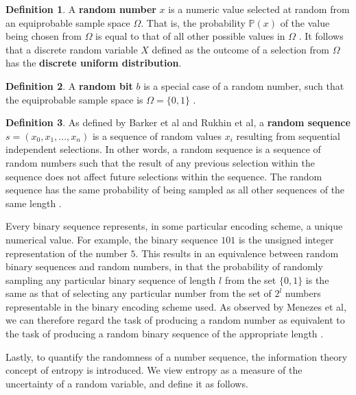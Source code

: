\documentclass[12pt, titlepage]{report}
\theoremstyle{definition}
\newtheorem{definition}{Definition}
\begin{document}
\begin{definition}
A \textbf{random number} $x$ is a numeric value selected at random from an equiprobable sample space $\Omega$. That is, the probability $\mathbb{P}(x)$ of the value being chosen from $\Omega$ is equal to that of all other possible values in $\Omega$ \cite[p. 7]{barker2007recommendation} \cite[s. 1.1.1]{rukhin2001statistical}. It follows that a discrete random variable $X$ defined as the outcome of a selection from $\Omega$ has the \textbf{discrete uniform distribution}.
\end{definition}

\begin{definition}
A \textbf{random bit} $b$ is a special case of a random number, such that the equiprobable sample space is $\Omega = \{0, 1\}$ \cite[s. 1.1.1]{rukhin2001statistical}.
\end{definition}

\begin{definition}
As defined by Barker et al and Rukhin et al, a \textbf{random sequence} $s = (x_0, x_1, ..., x_n)$ is a sequence of random values $x_i$ resulting from sequential independent selections. In other words, a random sequence is a sequence of random numbers such that the result of any previous selection within the sequence does not affect future selections within the sequence. The random sequence has the same probability of being sampled as all other sequences of the same length \cite[p. 7]{barker2007recommendation} \cite[s. 1.1.1]{rukhin2001statistical}.
\end{definition}

Every binary sequence represents, in some particular encoding scheme, a unique numerical value. For example, the binary sequence $101$ is the unsigned integer representation of the number $5$. This results in an equivalence between random binary sequences and random numbers, in that the probability of randomly sampling any particular binary sequence of length $l$ from the set $\{0, 1\}$ is the same as that of selecting any particular number from the set of $2^l$ numbers representable in the binary encoding scheme used. As observed by Menezes et al, we can therefore regard the task of producing a random number as equivalent to the task of producing a random binary sequence of the appropriate length \cite[p. 170]{menezes1996handbook}.

Lastly, to quantify the randomness of a number sequence, the information theory concept of entropy is introduced. We view entropy as a measure of the uncertainty of a random variable, and define it as follows.
\end{document}
